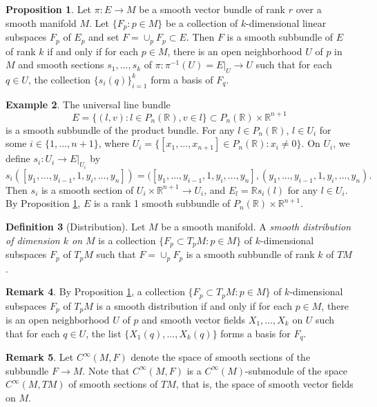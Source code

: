 \documentclass{amsart}
\numberwithin{equation}{section}
\newcommand{\bR}{\mathbb{R}}
\theoremstyle{definition}
\newtheorem{definition}{Definition} [section]
\newtheorem{example}[definition]{Example}
\newtheorem{remark}[definition]{Remark}
\theoremstyle{theorem}
\newtheorem{proposition}[definition]{Proposition}
\begin{document}
\begin{proposition}\label{subbundle}
Let $\pi : E \to M$ be a smooth vector bundle of rank $r$ over a smooth manifold $M$. Let $\{ F_p: p\in M\}$ be 
a collection of $k$-dimensional linear subspaces $F_p$ of $E_p$ and set $F = \cup_p F_p \subset E$. 
Then $F$ is a smooth subbundle of $E$ of rank $k$ if and only if for each $p \in M$, there is an open neighborhood 
$U$ of $p$ in $M$ and smooth sections $s_1, \ldots, s_k$ of $\pi : \pi^{-1}(U)=E|_U \to U$ 
such that for each $q \in U$, the collection $\{s_i(q)\}_{i=1}^k$ form a basis of $F_q$. 
\end{proposition}




\begin{example}
The universal line bundle 
\[
E = \{(l,v) : l \in P_n(\mathbb{R}) , v \in l\} \subset P_n(\bR) \times \bR^{n+1}
\]
is a smooth subbundle of the product bundle. For any $l\in P_n(\bR)$, 
$l\in U_i$ for some $i\in \{1,\ldots,n+1\}$, where $U_i=\{ [x_1,\ldots, x_{n+1}]\in P_n(\bR): x_i\neq 0\}$.
On $U_i$, we define $s_i:U_i\to E|_{U_i}$ by 
$$
s_i([y_1,\ldots, y_{i-1},1, y_i,\ldots, y_n]) = ([y_1,\ldots, y_{i-1},1, y_i,\ldots, y_n], 
(y_1,\ldots,y_{i-1},1,y_i,\ldots, y_n).
$$
Then $s_i$ is a smooth section of $U_i\times \bR^{n+1}\to U_i$, and 
$E_l = \bR s_i(l)$ for any $l\in U_i$.  By Proposition \ref{subbundle},
$E$ is a rank 1 smooth subbundle of $P_n(\bR)\times \bR^{n+1}$.

\end{example}


\begin{definition}[Distribution]
Let $M$ be a smooth manifold. A {\em smooth distribution of dimension $k$ on $M$} 
is a collection $\{F_p \subset T_pM : p \in M\}$ of $k$-dimensional subspaces $F_p$ of 
$T_pM$ such that $F = \cup_pF_p$ is a smooth subbundle of rank $k$ of $TM$. 
\end{definition}

\begin{remark}
By Proposition \ref{subbundle}, a collection $\{F_p \subset T_pM : p \in M\}$ of $k$-dimensional subspaces $F_p$ of $T_pM$ 
is a smooth distribution if and only if for each $p \in M$, there is an open neighborhood $U$ of $p$ and smooth vector fields $X_1, \ldots, X_k$ on $U$ such that for each $q \in U$, the list $\{X_1(q), \ldots, X_k(q)\}$ forms a basis for $F_q$. 
\end{remark}

\begin{remark}
Let $C^\infty(M,F)$ denote the space of smooth sections of the subbundle $F \to M$. 
Note that $C^\infty(M, F)$ is a $C^\infty(M)$-submodule of the space $C^\infty(M,TM)$ of smooth sections of $TM$, 
that is, the space of smooth vector fields on $M$. 
\end{remark}
\end{document}
